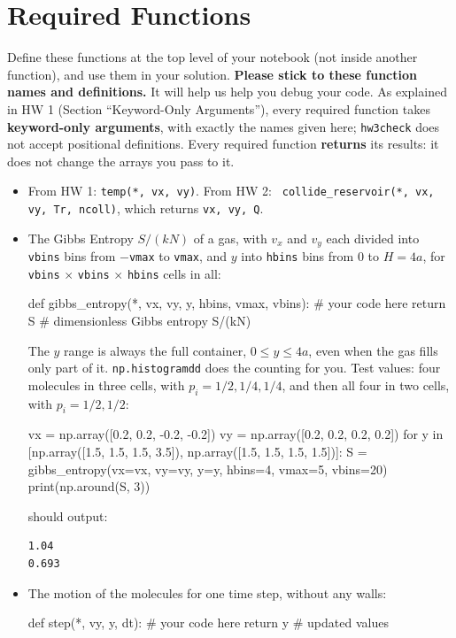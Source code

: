 \documentclass[12pt]{article}
\begin{document}
\section{Required Functions}

\noindent
Define these functions at the top level of your notebook (not inside
another function), and use them in your solution.  {\bf Please stick to
these function names and definitions.}  It will help us help you debug
your code.  As explained in HW 1 (Section ``Keyword-Only Arguments''),
every required function takes {\bf keyword-only arguments}, with exactly
the names given here; {\tt hw3check} does not accept positional
definitions.  Every required function {\bf returns} its results: it
does not change the arrays you pass to it.
\begin{itemize}
\item From HW 1: {\tt temp(*, vx, vy)}.  From HW 2: {\tt
  collide\_reservoir(*, vx, vy, Tr, ncoll)}, which returns {\tt vx,
  vy, Q}.
\item The Gibbs Entropy $S/(kN)$ of a gas, with $v_x$ and $v_y$ each
  divided into {\tt vbins} bins from $-${\tt vmax} to {\tt vmax}, and
  $y$ into {\tt hbins} bins from $0$ to $H = 4a$, for {\tt vbins}
  $\times$ {\tt vbins} $\times$ {\tt hbins} cells in all:
\begin{python}
def gibbs_entropy(*, vx, vy, y, hbins, vmax, vbins):
    # your code here
    return S # dimensionless Gibbs entropy S/(kN)
\end{python}
  The $y$ range is always the full container, $0 \le y \le 4a$, even
  when the gas fills only part of it.  {\tt np.histogramdd} does the
  counting for you.  Test values: four molecules in three cells, with
  $p_i = 1/2, 1/4, 1/4$, and then all four in two cells, with $p_i =
  1/2, 1/2$:
\begin{python}
vx = np.array([0.2, 0.2, -0.2, -0.2])
vy = np.array([0.2, 0.2, 0.2, 0.2])
for y in [np.array([1.5, 1.5, 1.5, 3.5]), np.array([1.5, 1.5, 1.5, 1.5])]:
    S = gibbs_entropy(vx=vx, vy=vy, y=y, hbins=4, vmax=5, vbins=20)
    print(np.around(S, 3))
\end{python}
  should output:
\begin{verbatim}
1.04
0.693
\end{verbatim}
\item The motion of the molecules for one time step, without any walls:
\begin{python}
def step(*, vy, y, dt):
    # your code here
    return y # updated values
\end{python}

\end{itemize}
\end{document}
